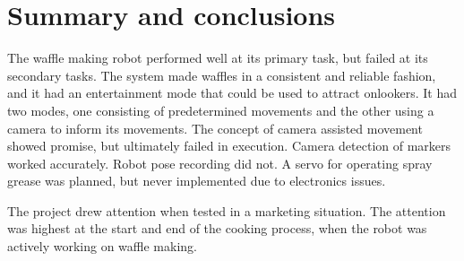 \section{Summary and conclusions}


The waffle making robot performed well at its primary task, but failed at its secondary tasks. 
The system made waffles in a consistent and reliable fashion, and it had an entertainment mode that could be used to attract onlookers. It had two modes, one consisting of predetermined movements and the other using a camera to inform its movements.
The concept of camera assisted movement showed promise, but ultimately failed in execution. %
Camera detection of markers worked accurately. Robot pose recording did not. 
A servo for operating spray grease was planned, but never implemented due to electronics issues. 

The project drew attention when tested in a marketing situation. The attention was highest at the start and end of the cooking process, when the robot was actively working on waffle making.
